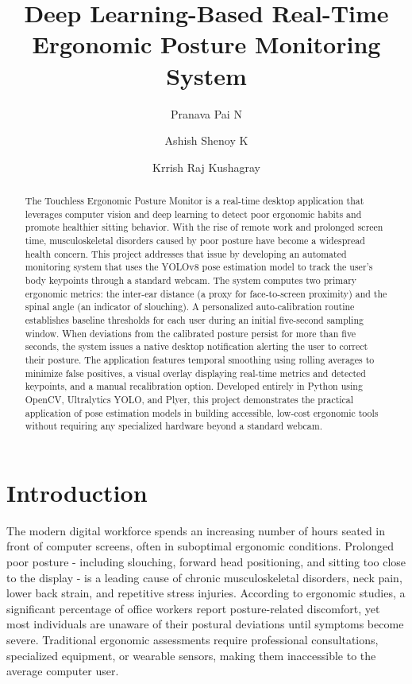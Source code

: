 \documentclass{llncs}
\begin{document}
\title{Deep Learning-Based Real-Time Ergonomic Posture Monitoring System}

\author{Pranava Pai N \and Ashish Shenoy K \and Krrish Raj Kushagray}


\maketitle

\begin{abstract}
The Touchless Ergonomic Posture Monitor is a real-time desktop application that leverages computer vision and deep learning to detect poor ergonomic habits and promote healthier sitting behavior. With the rise of remote work and prolonged screen time, musculoskeletal disorders caused by poor posture have become a widespread health concern. This project addresses that issue by developing an automated monitoring system that uses the YOLOv8 pose estimation model to track the user's body keypoints through a standard webcam. The system computes two primary ergonomic metrics: the inter-ear distance (a proxy for face-to-screen proximity) and the spinal angle (an indicator of slouching). A personalized auto-calibration routine establishes baseline thresholds for each user during an initial five-second sampling window. When deviations from the calibrated posture persist for more than five seconds, the system issues a native desktop notification alerting the user to correct their posture. The application features temporal smoothing using rolling averages to minimize false positives, a visual overlay displaying real-time metrics and detected keypoints, and a manual recalibration option. Developed entirely in Python using OpenCV, Ultralytics YOLO, and Plyer, this project demonstrates the practical application of pose estimation models in building accessible, low-cost ergonomic tools without requiring any specialized hardware beyond a standard webcam.
\end{abstract}


\section{Introduction}
The modern digital workforce spends an increasing number of hours seated in front of computer screens, often in suboptimal ergonomic conditions. Prolonged poor posture - including slouching, forward head positioning, and sitting too close to the display - is a leading cause of chronic musculoskeletal disorders, neck pain, lower back strain, and repetitive stress injuries. According to ergonomic studies, a significant percentage of office workers report posture-related discomfort, yet most individuals are unaware of their postural deviations until symptoms become severe. Traditional ergonomic assessments require professional consultations, specialized equipment, or wearable sensors, making them inaccessible to the average computer user.
\end{document}
